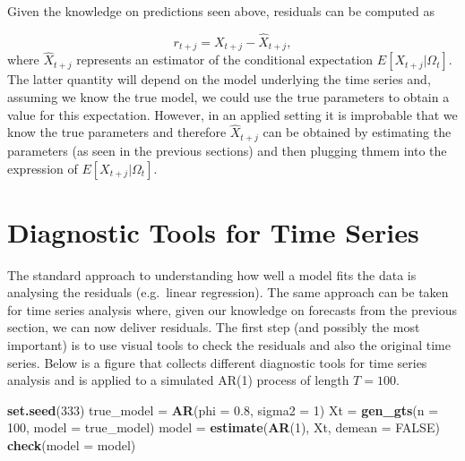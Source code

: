 \documentclass[]{book}
\newenvironment{Shaded}{\begin{snugshade}}{\end{snugshade}}
\newcommand{\DataTypeTok}[1]{\textcolor[rgb]{0.13,0.29,0.53}{#1}}
\newcommand{\DecValTok}[1]{\textcolor[rgb]{0.00,0.00,0.81}{#1}}
\newcommand{\FloatTok}[1]{\textcolor[rgb]{0.00,0.00,0.81}{#1}}
\newcommand{\KeywordTok}[1]{\textcolor[rgb]{0.13,0.29,0.53}{\textbf{#1}}}
\newcommand{\NormalTok}[1]{#1}
\newcommand{\OtherTok}[1]{\textcolor[rgb]{0.56,0.35,0.01}{#1}}
\newcommand{\StringTok}[1]{\textcolor[rgb]{0.31,0.60,0.02}{#1}}
\theoremstyle{definition}
\theoremstyle{definition}
\theoremstyle{definition}
\theoremstyle{remark}
\begin{document}
Given the knowledge on predictions seen above, residuals can be computed
as

\[r_{t+j} = X_{t+j} - \hat{X}_{t+j},\] where \(\hat{X}_{t+j}\)
represents an estimator of the conditional expectation
\(E[X_{t+j} | \Omega_{t}]\). The latter quantity will depend on the
model underlying the time series and, assuming we know the true model,
we could use the true parameters to obtain a value for this expectation.
However, in an applied setting it is improbable that we know the true
parameters and therefore \(\hat{X}_{t+j}\) can be obtained by estimating
the parameters (as seen in the previous sections) and then plugging
thmem into the expression of \(E[X_{t+j} | \Omega_{t}]\).

\hypertarget{diagnostic-tools-for-time-series}{%
\section{Diagnostic Tools for Time
Series}\label{diagnostic-tools-for-time-series}}

The standard approach to understanding how well a model fits the data is
analysing the residuals (e.g.~linear regression). The same approach can
be taken for time series analysis where, given our knowledge on
forecasts from the previous section, we can now deliver residuals. The
first step (and possibly the most important) is to use visual tools to
check the residuals and also the original time series. Below is a figure
that collects different diagnostic tools for time series analysis and is
applied to a simulated AR(1) process of length \(T = 100\).

\begin{Shaded}
\begin{Highlighting}[]
\KeywordTok{set.seed}\NormalTok{(}\DecValTok{333}\NormalTok{)}
\NormalTok{true_model =}\StringTok{ }\KeywordTok{AR}\NormalTok{(}\DataTypeTok{phi =} \FloatTok{0.8}\NormalTok{, }\DataTypeTok{sigma2 =} \DecValTok{1}\NormalTok{)}
\NormalTok{Xt =}\StringTok{ }\KeywordTok{gen_gts}\NormalTok{(}\DataTypeTok{n =} \DecValTok{100}\NormalTok{, }\DataTypeTok{model =}\NormalTok{ true_model)}
\NormalTok{model =}\StringTok{ }\KeywordTok{estimate}\NormalTok{(}\KeywordTok{AR}\NormalTok{(}\DecValTok{1}\NormalTok{), Xt, }\DataTypeTok{demean =} \OtherTok{FALSE}\NormalTok{)}
\KeywordTok{check}\NormalTok{(}\DataTypeTok{model =}\NormalTok{ model)}
\end{Highlighting}
\end{Shaded}
\end{document}
